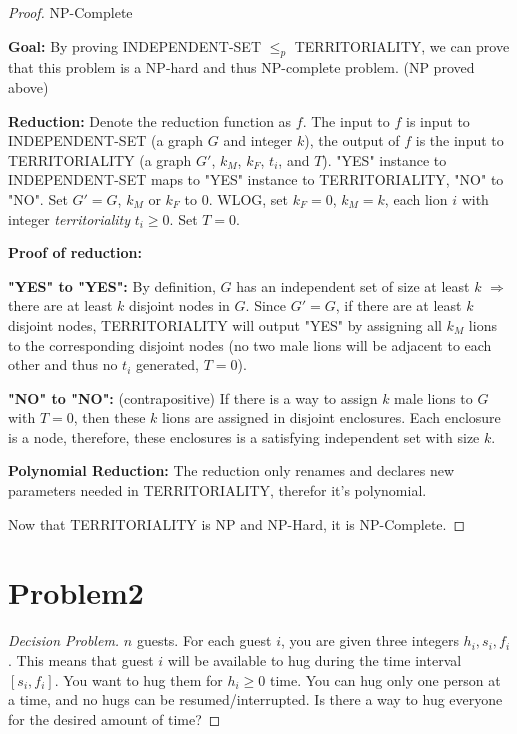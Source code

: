 \documentclass[openany]{article}
\begin{document}
\begin{proof}{NP-Complete}

\textbf{Goal:} By proving INDEPENDENT-SET $\leqslant_p$ TERRITORIALITY, we can prove that this problem is a NP-hard and thus NP-complete problem. (NP proved above)

\textbf{Reduction:} Denote the reduction function as $f$. The input to $f$ is input to INDEPENDENT-SET (a graph $G$ and integer $k$), the output of $f$ is the input to TERRITORIALITY (a graph $G'$, $k_M$, $k_F$, $t_i$, and $T$). "YES" instance to INDEPENDENT-SET maps to "YES" instance to TERRITORIALITY, "NO" to "NO". Set $G' = G$, $k_M$ or $k_F$ to $0$. WLOG, set $k_F=0$, $k_M = k$, each lion $i$ with integer \textit{territoriality} $t_i\geqslant 0$. Set $T=0$.

\textbf{Proof of reduction:}

\textbf{"YES" to "YES":} By definition, $G$ has an independent set of size at least $k$ $\Rightarrow$ there are at least $k$ disjoint nodes in $G$. Since $G' = G$, if there are at least $k$ disjoint nodes, TERRITORIALITY will output "YES" by assigning all $k_M$ lions to the corresponding disjoint nodes (no two male lions will be adjacent to each other and thus no $t_i$ generated, $T=0$).

\textbf{"NO" to "NO":} (contrapositive) If there is a way to assign $k$ male lions to $G$ with $T=0$, then these $k$ lions are assigned in disjoint enclosures. Each enclosure is a node, therefore, these enclosures is a satisfying independent set with size $k$.

\textbf{Polynomial Reduction:} The reduction only renames and declares new parameters needed in TERRITORIALITY, therefor it's polynomial.

Now that TERRITORIALITY is NP and NP-Hard, it is NP-Complete.

\end{proof}

\section*{Problem2}

\begin{proof}[Decision Problem]
    \renewcommand{\qedsymbol}{}
    $n$ guests. For each guest $i$, you are given three integers $h_i, s_i, f_i$. This means that guest $i$ will be available to hug during the time interval $[s_i, f_i]$. You want to hug them for $h_i \geqslant 0$ time. You can hug only one person at a time, and no hugs can be resumed/interrupted.
    Is there a way to hug everyone for the desired amount of time?
\end{proof}
\end{document}
